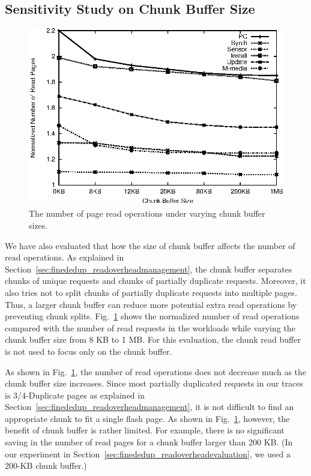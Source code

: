 \subsection{Sensitivity Study on Chunk Buffer Size}
\begin{figure}[t]
	\center
	\includegraphics[scale=0.8]{figure/finededup/chunkbuffersize}
	\caption{The number of page read operations under varying chunk buffer sizes.} %
	\label{fig:chunkbuffersize}
\end{figure}


We have also evaluated that how the size of chunk buffer affects the number of read operations.
As explained in Section~\ref{sec:finededup_readoverheadmanagement},
the chunk buffer separates chunks of unique requests and chunks of partially duplicate requests.
Moreover, it also tries not to split chunks of partially duplicate requests into multiple pages.
Thus, a larger chunk buffer can reduce more potential extra read operations by preventing chunk splits.
Fig.~\ref{fig:chunkbuffersize} shows the normalized number of read operations compared with the number of read requests
in the workloads while varying the chunk buffer size from 8 KB to 1 MB.
For this evaluation, the chunk read buffer is not used to focus only on the chunk buffer.

As shown in Fig.~\ref{fig:chunkbuffersize}, the number of read operations does not decrease much as the chunk buffer size increases.
Since most partially duplicated requests in our traces is 3/4-Duplicate pages as explained
in Section~\ref{sec:finededup_readoverheadmanagement}, 
it is not difficult to find an appropriate chunk to fit a single flash page.
As shown in Fig.~\ref{fig:chunkbuffersize}, however, the benefit of chunk buffer is rather limited.
For example, there is no significant saving in the number of read pages for a chunk buffer larger than 200 KB. 
(In our experiment in Section~\ref{sec:finededup_readoverheadevaluation}, we used a 200-KB chunk buffer.)


